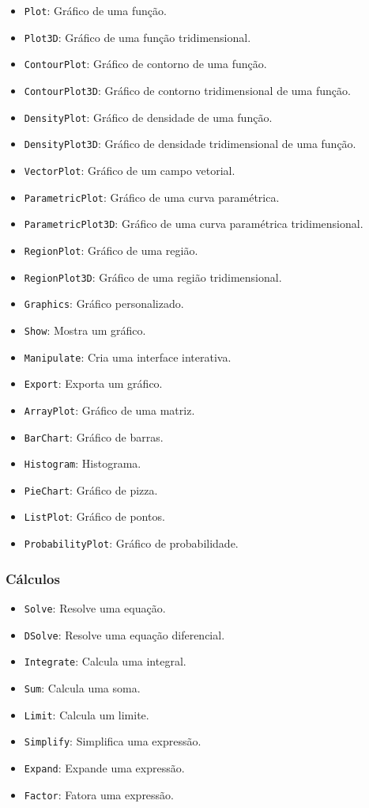 \documentclass[a4paper, 12pt]{article}
\begin{document}
\begin{itemize}
    \item \texttt{Plot}: Gráfico de uma função.
    \item \texttt{Plot3D}: Gráfico de uma função tridimensional.
    \item \texttt{ContourPlot}: Gráfico de contorno de uma função.
    \item \texttt{ContourPlot3D}: Gráfico de contorno tridimensional de uma função.
    \item \texttt{DensityPlot}: Gráfico de densidade de uma função.
    \item \texttt{DensityPlot3D}: Gráfico de densidade tridimensional de uma função.
    \item \texttt{VectorPlot}: Gráfico de um campo vetorial.
    \item \texttt{ParametricPlot}: Gráfico de uma curva paramétrica.
    \item \texttt{ParametricPlot3D}: Gráfico de uma curva paramétrica tridimensional.
    \item \texttt{RegionPlot}: Gráfico de uma região.
    \item \texttt{RegionPlot3D}: Gráfico de uma região tridimensional.
    \item \texttt{Graphics}: Gráfico personalizado.
    \item \texttt{Show}: Mostra um gráfico.
    \item \texttt{Manipulate}: Cria uma interface interativa.
    \item \texttt{Export}: Exporta um gráfico.
    \item \texttt{ArrayPlot}: Gráfico de uma matriz.
    \item \texttt{BarChart}: Gráfico de barras.
    \item \texttt{Histogram}: Histograma.
    \item \texttt{PieChart}: Gráfico de pizza.
    \item \texttt{ListPlot}: Gráfico de pontos.
    \item \texttt{ProbabilityPlot}: Gráfico de probabilidade.
\end{itemize}

\subsubsection{Cálculos}\label{calculos}

\begin{itemize}
    \item \texttt{Solve}: Resolve uma equação.
    \item \texttt{DSolve}: Resolve uma equação diferencial.
    \item \texttt{Integrate}: Calcula uma integral.
    \item \texttt{Sum}: Calcula uma soma.
    \item \texttt{Limit}: Calcula um limite.
    \item \texttt{Simplify}: Simplifica uma expressão.
    \item \texttt{Expand}: Expande uma expressão.
    \item \texttt{Factor}: Fatora uma expressão.
\end{itemize}
\end{document}
